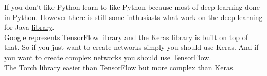 If you don't like Python learn to like Python because most of deep learning done in Python. However there is still some inthusiasts what work on the deep learning for Java \href{http://deeplearning4j.org}{library}.\\
Google represents \href{https://www.tensorflow.org/}{TensorFlow} library and the \href{keras.io}{Keras} library is built on top of that. So if you just want to create networks simply you should use Keras. And if you want to create complex networks you should use TensorFlow.\\
The \href{torch.ch}{Torch} library easier than TensorFlow but more complex than Keras.
